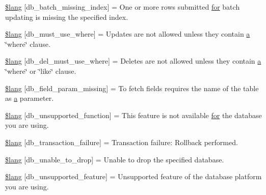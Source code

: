 \begin{DoxyCompactItemize}
\item 
\hyperlink{db__lang_8php_af946769a3dd5679c60e6f2ef5f7a5aa1}{\$lang} \mbox{[}\textquotesingle{}db\+\_\+batch\+\_\+missing\+\_\+index\textquotesingle{}\mbox{]} = \textquotesingle{}One or more rows submitted \hyperlink{confirm__transfer_8php_aaf007b9fa5c90d7c5a7011bece9cfc15}{for} batch updating is missing the specified index.\textquotesingle{}
\item 
\hyperlink{db__lang_8php_add4bfc65af76fda2c48fa6a2e8d2e506}{\$lang} \mbox{[}\textquotesingle{}db\+\_\+must\+\_\+use\+\_\+where\textquotesingle{}\mbox{]} = \textquotesingle{}Updates are not allowed unless they contain \hyperlink{bootstrap_8min_8js_a1f5870dcf487187f13d5fd328ed9e6e7}{a} \char`\"{}where\char`\"{} clause.\textquotesingle{}
\item 
\hyperlink{db__lang_8php_a256ae2de791e589ddc23012f74f390ea}{\$lang} \mbox{[}\textquotesingle{}db\+\_\+del\+\_\+must\+\_\+use\+\_\+where\textquotesingle{}\mbox{]} = \textquotesingle{}Deletes are not allowed unless they contain \hyperlink{bootstrap_8min_8js_a1f5870dcf487187f13d5fd328ed9e6e7}{a} \char`\"{}where\char`\"{} or \char`\"{}like\char`\"{} clause.\textquotesingle{}
\item 
\hyperlink{db__lang_8php_a9101352a8cd8c8f34a6b8b1e30c45d8a}{\$lang} \mbox{[}\textquotesingle{}db\+\_\+field\+\_\+param\+\_\+missing\textquotesingle{}\mbox{]} = \textquotesingle{}To fetch fields requires the name of the table as \hyperlink{bootstrap_8min_8js_a1f5870dcf487187f13d5fd328ed9e6e7}{a} parameter.\textquotesingle{}
\item 
\hyperlink{db__lang_8php_a77c256be8532e23e8463481f51732116}{\$lang} \mbox{[}\textquotesingle{}db\+\_\+unsupported\+\_\+function\textquotesingle{}\mbox{]} = \textquotesingle{}This feature is not available \hyperlink{confirm__transfer_8php_aaf007b9fa5c90d7c5a7011bece9cfc15}{for} the database you are using.\textquotesingle{}
\item 
\hyperlink{db__lang_8php_a35f225a7ead01f13f8c6423b7c7433a0}{\$lang} \mbox{[}\textquotesingle{}db\+\_\+transaction\+\_\+failure\textquotesingle{}\mbox{]} = \textquotesingle{}Transaction failure\+: Rollback performed.\textquotesingle{}
\item 
\hyperlink{db__lang_8php_af391f0d50d64cbb95cd733fa947fdb5e}{\$lang} \mbox{[}\textquotesingle{}db\+\_\+unable\+\_\+to\+\_\+drop\textquotesingle{}\mbox{]} = \textquotesingle{}Unable to drop the specified database.\textquotesingle{}
\item 
\hyperlink{db__lang_8php_ac9a47dcf094e785346ea1834e63df941}{\$lang} \mbox{[}\textquotesingle{}db\+\_\+unsupported\+\_\+feature\textquotesingle{}\mbox{]} = \textquotesingle{}Unsupported feature of the database platform you are using.\textquotesingle{}

\end{DoxyCompactItemize}
